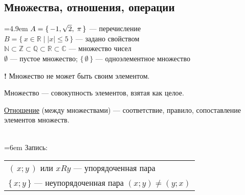 \subsection{%
  Множества, отношения, операции%
}
\begin{example}[1]
\hangindent=4.9em
$A = \{\,-1,\hspace{1mm}\sqrt[]{2},\hspace{1mm}\pi\,\}$ --- перечисление\\[2mm]
$B = \{\, x \in \mathbb{R} \mid |x| \le 5 \,\}$ --- задано свойством\\[2mm]
$\mathbb{N} \subset \mathbb{Z} \subset \mathbb{Q} \subset \mathbb{R} \subset \mathbb{C}$ --- множество чисел\\[2mm]
$\emptyset$ --- пустое множество; $\{\,\emptyset\,\}$ --- одноэлементное множество
\end{example}
{\Large \textbf{!}} Множество не может быть своим элементом.
\begin{concept}[1]
Множество --- совокупность элементов, взятая как целое.
\end{concept}
\begin{concept}[2]
\underline{Отношение} (между множествами) --- соответствие, правило, сопоставление элементов множеств.
\end{concept}
\hspace{6em}%
\\[1mm]
\hangindent=6em
Запись:
\begin{tabular}[t]{@{}l@{}}
	$(\,x; y\,)$ или $x R y$ --- упорядоченная пара\\
	$\{\,x; y\,\}$ --- неупорядоченная пара $(x; y) \neq (y; x)$\\
\end{tabular}
